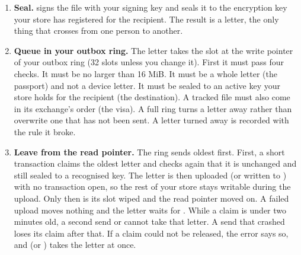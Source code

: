 \begin{enumerate}
  \item \textbf{Seal.}  signs the file with your signing key and
  seals it to the encryption key your store has registered for the recipient.
  The result is a  letter, the only thing that crosses from one
  person to another.
  \item \textbf{Queue in your outbox ring.} The letter takes the slot at the
  write pointer of your outbox ring (32 slots unless you change it). First it
  must pass four checks. It must be no larger than 16 MiB. It must be a whole
   letter (the passport) and not a device letter. It must be sealed
  to an active key your store holds for the recipient (the destination). A
  tracked file must also come in its exchange's order (the visa). A full ring
  turns a letter away rather than overwrite one that has not been sent. A
  letter turned away is recorded with the rule it broke.
  \item \textbf{Leave from the read pointer.} The ring sends oldest first.
  First, a short transaction claims the oldest letter and checks again that it
  is unchanged and still sealed to a recognised key. The letter is then
  uploaded (or written to ) with no transaction open, so the
  rest of your store stays writable during the upload. Only then is its slot
  wiped and the read pointer moved on. A failed upload moves nothing and the
  letter waits for . While a claim is under two minutes old,
  a second send or  cannot take that letter. A send that
  crashed loses its claim after that. If a claim could not be released, the
  error says so, and  (or ) takes the letter at once.


\end{enumerate}
